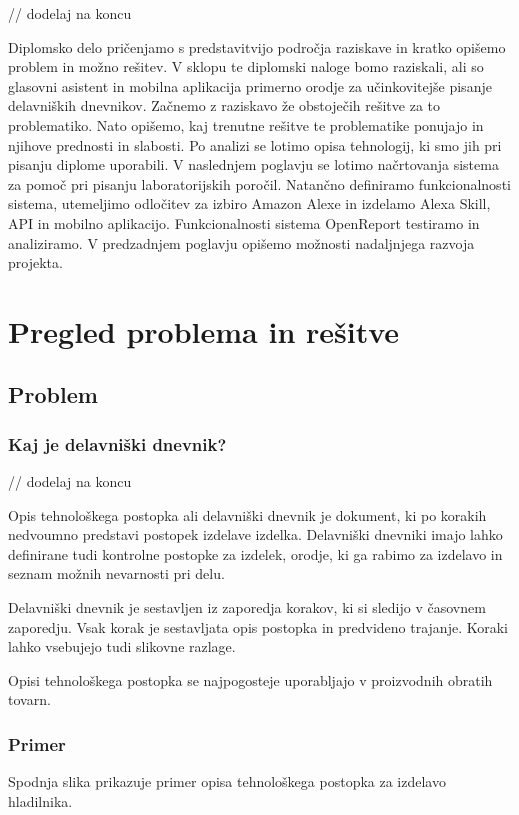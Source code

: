\documentclass[a4paper, 12pt]{book}
\begin{document}
// dodelaj na koncu

Diplomsko delo pričenjamo s predstavitvijo področja raziskave in kratko opišemo problem in možno rešitev. 
V sklopu te diplomski naloge bomo raziskali, ali so glasovni asistent in mobilna aplikacija primerno orodje za učinkovitejše pisanje delavniških dnevnikov.
Začnemo z raziskavo že obstoječih rešitve za to problematiko.
Nato opišemo, kaj trenutne rešitve te problematike ponujajo in njihove prednosti in slabosti.
Po analizi se lotimo opisa tehnologij, ki smo jih pri pisanju diplome uporabili.
V naslednjem poglavju se lotimo načrtovanja sistema za pomoč pri pisanju laboratorijskih poročil.
Natančno definiramo funkcionalnosti sistema, utemeljimo odločitev za izbiro Amazon Alexe in izdelamo Alexa Skill, API in mobilno aplikacijo.
Funkcionalnosti sistema OpenReport testiramo in analiziramo.
V predzadnjem poglavju opišemo možnosti nadaljnjega razvoja projekta.

\chapter{Pregled problema in rešitve}

\section{Problem}

\subsection {Kaj je delavniški dnevnik?}

// dodelaj na koncu

Opis tehnološkega postopka ali delavniški dnevnik je dokument, ki po korakih nedvoumno predstavi postopek izdelave izdelka.
Delavniški dnevniki imajo lahko definirane tudi kontrolne postopke za izdelek, orodje, ki ga rabimo za izdelavo in seznam možnih nevarnosti pri delu.

Delavniški dnevnik je sestavljen iz zaporedja korakov, ki si sledijo v časovnem zaporedju.
Vsak korak je sestavljata opis postopka in predvideno trajanje.
Koraki lahko vsebujejo tudi slikovne razlage.

Opisi tehnološkega postopka se najpogosteje uporabljajo v proizvodnih obratih tovarn.

\subsection{Primer}
Spodnja slika prikazuje primer opisa tehnološkega postopka za izdelavo hladilnika.
\end{document}
